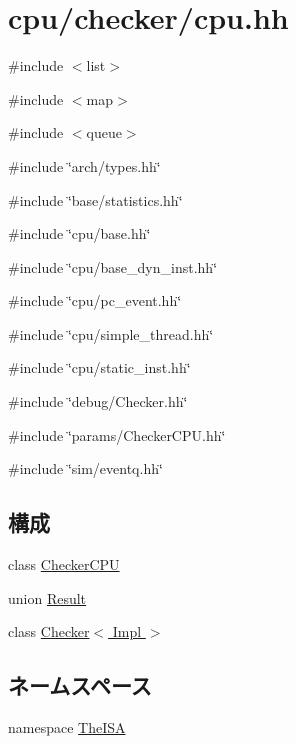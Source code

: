 \hypertarget{checker_2cpu_8hh}{
\section{cpu/checker/cpu.hh}
\label{checker_2cpu_8hh}
}
{\ttfamily \#include $<$list$>$}\par
{\ttfamily \#include $<$map$>$}\par
{\ttfamily \#include $<$queue$>$}\par
{\ttfamily \#include \char`\"{}arch/types.hh\char`\"{}}\par
{\ttfamily \#include \char`\"{}base/statistics.hh\char`\"{}}\par
{\ttfamily \#include \char`\"{}cpu/base.hh\char`\"{}}\par
{\ttfamily \#include \char`\"{}cpu/base\_\-dyn\_\-inst.hh\char`\"{}}\par
{\ttfamily \#include \char`\"{}cpu/pc\_\-event.hh\char`\"{}}\par
{\ttfamily \#include \char`\"{}cpu/simple\_\-thread.hh\char`\"{}}\par
{\ttfamily \#include \char`\"{}cpu/static\_\-inst.hh\char`\"{}}\par
{\ttfamily \#include \char`\"{}debug/Checker.hh\char`\"{}}\par
{\ttfamily \#include \char`\"{}params/CheckerCPU.hh\char`\"{}}\par
{\ttfamily \#include \char`\"{}sim/eventq.hh\char`\"{}}\par
\subsection*{構成}
\begin{DoxyCompactItemize}
\item 
class \hyperlink{classCheckerCPU}{CheckerCPU}
\item 
union \hyperlink{unionCheckerCPU_1_1Result}{Result}
\item 
class \hyperlink{classChecker}{Checker$<$ Impl $>$}
\end{DoxyCompactItemize}
\subsection*{ネームスペース}
\begin{DoxyCompactItemize}
\item 
namespace \hyperlink{namespaceTheISA}{TheISA}
\end{DoxyCompactItemize}
